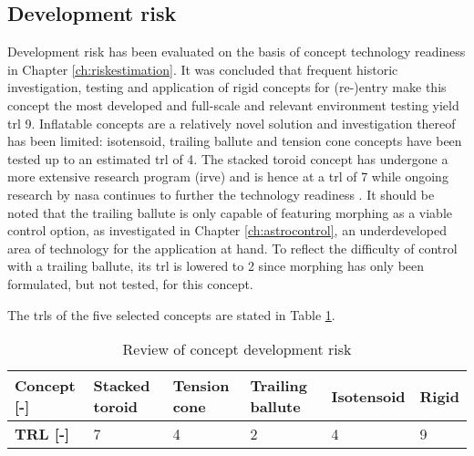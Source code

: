 \subsection{Development risk}
Development risk has been evaluated on the basis of concept technology readiness in Chapter \ref{ch:riskestimation}. It was concluded that frequent historic investigation, testing and application of rigid concepts for (re-)entry make this concept the most developed and full-scale and relevant environment testing yield \acrfull{trl} 9. Inflatable concepts are a relatively novel solution and investigation thereof has been limited: isotensoid, trailing ballute and tension cone concepts have been tested up to an estimated \gls{trl} of 4. The stacked toroid concept has undergone a more extensive research program (\acrfull{irve}) and is hence at a \gls{trl} of 7 while ongoing research by \gls{nasa} continues to further the technology readiness \cite{Dillman2014}. It should be noted that the trailing ballute is only capable of featuring morphing as a viable control option, as investigated in Chapter \ref{ch:astrocontrol}, an underdeveloped area of technology for the application at hand. To reflect the difficulty of control with a trailing ballute, its \gls{trl} is lowered to 2 since morphing has only been formulated, but not tested, for this concept.

The \glspl{trl} of the five selected concepts are stated in Table \ref{tab:gls_rev}.

\begin{table}[h]
\centering
\caption{Review of concept development risk}
\begin{tabular}{|l|l|l|l|l|l|}
\hline
\textbf{Concept {[}-{]}} & Stacked toroid & Tension cone & Trailing ballute & Isotensoid & Rigid \\ \hline
\textbf{TRL {[}-{]}}     &\cellcolor{green!70} 7  &\cellcolor{yellow!75}  4   &\cellcolor{red!60} 2 & \cellcolor{yellow!75}      4          &\cellcolor{green!70} 9     \\ \hline
\end{tabular}
\label{tab:gls_rev}
\end{table}

